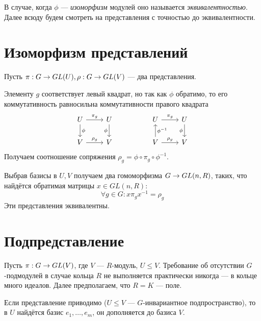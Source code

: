 В случае, когда $\phi$ --- \emph{изоморфизм} модулей оно называется \emph{эквивалентностью}.
Далее всюду будем смотреть на представления с точностью до эквивалентности.


\section{Изоморфизм представлений}
Пусть $\pi: G \rightarrow GL(U), \rho: G \rightarrow GL(V)$ --- два представления.

Элементу $g$ соответствует левый квадрат, но так как $\phi$ обратимо, то его коммутативность равносильна коммутативности правого квадрата
\[\begin{tikzcd}[ampersand replacement=\&]
      U \& U \&\& U \& U \\
      V \& V \&\& V \& V
      \arrow["\phi", from=1-1, to=2-1]
      \arrow["{\pi_g}", from=1-1, to=1-2]
      \arrow["{\rho_g}", from=2-1, to=2-2]
      \arrow["\phi"', from=1-2, to=2-2]
      \arrow["{\rho_g}", from=2-4, to=2-5]
      \arrow["{\pi_g}", from=1-4, to=1-5]
      \arrow["{\phi^{-1}}"', from=2-4, to=1-4]
      \arrow["\phi"', from=1-5, to=2-5]
\end{tikzcd}\]
Получаем соотношение сопряжения $\rho_g = \phi \circ \pi_g \circ \phi^{-1}$.

Выбрав базисы в $U, V$ получаем два гомоморфизма $G \rightarrow GL(n, R)$, таких, что найдётся обратимая матрицы $x \in GL(n, R)$:
\[\forall g \in G: x \pi_g x^{-1} = \rho_g\]
Эти представления эквивалентны.


\section{Подпредставление}
Пусть $\pi: G \rightarrow GL(V)$, где $V$ --- $R$-модуль, $U \le V$.
Требование об отсутствии $G$-подмодулей в случае кольца $R$ не выполняется практически никогда --- в кольце много идеалов.
Далее предполагаем, что $R = K$ --- поле.

Если представление приводимо ($U \le V$ --- $G$-инвариантное подпространство), то в $U$ найдётся базис $e_1, \dots, e_m$, он дополняется до базиса $V$.


